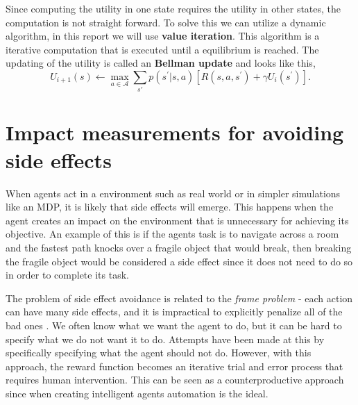 \documentclass[12pt,A4]{report}
\theoremstyle{definition}
\begin{document}
Since computing the utility in one state requires the utility in other states, the computation is not straight forward. To solve this we can utilize a dynamic algorithm, in this report we will use \textbf{value iteration}. This algorithm is a iterative computation that is executed until a equilibrium is reached. The updating of the utility is called an \textbf{Bellman update} and looks like this,
\[U_{i+1}(s) \leftarrow \max_{a\in\mathcal{A}} \sum_{s\prime} p(s^\prime|s,a)[R(s,a,s^\prime) + \gamma U_i(s^\prime)].\]




\section{Impact measurements for avoiding side effects}
When agents act in a environment such as real world or in simpler simulations like an MDP, it is likely that side effects will emerge. This happens when the agent creates an impact on the environment that is unnecessary for achieving its objective. An example of this is if the agents task is to navigate across a room and the fastest path knocks over a fragile object that would break, then breaking the fragile object would be considered a side effect since it does not need to do so in order to complete its task. 

The problem of side effect avoidance is related to the \textit{frame problem} - each action can have many side effects, and it is impractical to explicitly penalize all of the bad ones \autocite{The Frame Problem in Artificial Intelligence, Frank M Brown}. We often know what we want the agent to do, but it can be hard to specify what we do not want it to do. Attempts have been made at this by specifically specifying what the agent should not do\autocite{Zhang et al}. However, with this approach, the reward function becomes an iterative trial and error process that requires human intervention. This can be seen as a counterproductive approach since when creating intelligent agents automation is the ideal. 
\end{document}
